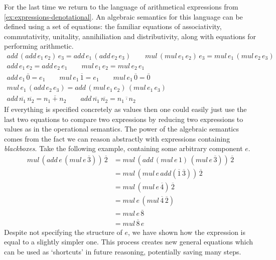 \begin{example}\label{ex:expressions-algebraic}
    For the last time we return to the language of arithmetical expressions from
    \cref{ex:expressions-denotational}.
    An algebraic semantics for this language can be defined using a set of
    equations: the familiar equations of associativity, commutativity,
    unitality, annihiliation and distributivity, along with equations for
    performing arithmetic.
    \begin{gather*}
        add\,(add\,e_1\,e_2)\,e_3 = add\,e_1\,(add\,e_2\,e_3)
        \qquad
        mul\,(mul\,e_1\,e_2)\,e_3 = mul\,e_1\,(mul\,e_2\,e_3)
        \\
        add\,e_1\,e_2 = add\,e_2\,e_1
        \qquad
        mul\,e_1\,e_2 = mul\,e_2\,e_1
        \\
        add\,e_1\,\overline{0} = e_1
        \qquad
        mul\,e_1\,\overline{1} = e_1
        \qquad
        mul\,e_1\,\overline{0} = \overline{0}
        \\
        mul\,e_1\,(add\,e_2\,e_3) = add\,(mul\,e_1\,e_2)\,(mul\,e_1\,e_3)
        \\
        add\,\overline{n_1}\,\overline{n_2} = \overline{n_1+n_2}
        \qquad
        add\,\overline{n_1}\,\overline{n_2} = \overline{n_1 \cdot n_2}
    \end{gather*}
    If everything is specified concretely as values then one could easily just
    use the last two equations to compare two expressions by reducing
    two expressions to values as in the operational semantics.
    The power of the algebraic semantics comes from the fact we can reason
    abstractly with expressions containing \emph{blackboxes}.
    Take the following example, containing some arbitrary component \(e\).
    \begin{align*}
        mul\,(add\,e\,(mul\,e\,\overline{3}))\,\overline{2}
         & =
        mul\,(add\,(mul\,e\,1)\,(mul\,e\,\overline{3}))\,\overline{2}
        \\
         & =
        mul\,(mul\,e\, add(\overline{1}\,\overline{3}))\,\overline{2}
        \\
         & =
        mul\,(mul \,e\,\overline{4})\,\overline{2}
        \\
         & =
        mul\,e\,(mul \,\overline{4}\,\overline{2})
        \\
         & =
        mul\,e\,\overline{8}
        \\
         & =
        mul\,\overline{8}\,e
    \end{align*}
    Despite not specifying the structure of \(e\), we have
    shown how the expression is equal to a slightly simpler one.
    This process creates new general equations which can be used as `shortcuts'
    in future reasoning, potentially saving many steps.
\end{example}

